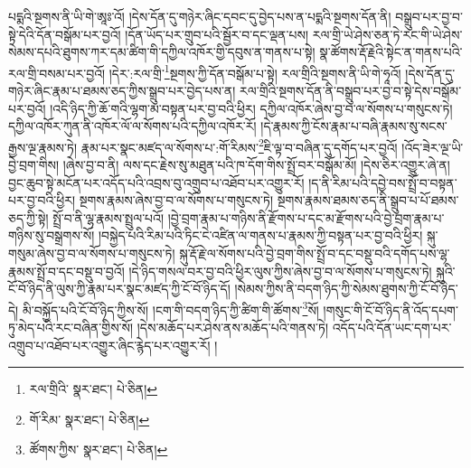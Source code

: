པདྨའི་སྔགས་ནི་ཡི་གེ་ཨཱཿ་འོ། །དེས་དོན་དུ་གཉེར་ཞིང་དབང་དུ་བྱེད་པས་ན་པདྨའི་སྔགས་དོན་ནི། བསྒྲུབ་པར་བྱ་བ་སྟེ་དེའི་དོན་བསྒོམ་པར་བྱའོ། །དོན་ཡོད་པར་གྲུབ་པའི་སྦྱོར་བ་དང་ལྡན་པས། རལ་གྲི་ཡེ་ཤེས་ཅན་ཏེ་རང་གི་ཡེ་ཤེས་སེམས་དཔའི་ཐུགས་ཀར་དམ་ཚིག་གི་དཀྱིལ་འཁོར་གྱི་དབུས་ན་གནས་པ་སྟེ། སྣ་ཚོགས་རྡོ་རྗེའི་སྟེང་ན་གནས་པའི་རལ་གྲི་བསམ་པར་བྱའོ། །དེར་:རལ་གྲི་\footnote{རལ་གྲིའི་  སྣར་ཐང་།  པེ་ཅིན། }སྔགས་ཀྱི་དོན་བསྒོམ་པ་སྟེ། རལ་གྲིའི་སྔགས་ནི་ཡི་གེ་ཧཱའོ། །དེས་དོན་དུ་གཉེར་ཞིང་རྣམ་པ་ཐམས་ཅད་ཀྱིས་སྒྲུབ་པར་བྱེད་པས་ན། རལ་གྲིའི་སྔགས་དོན་ནི་བསྒྲུབ་པར་བྱ་བ་སྟེ་དེས་བསྒོམ་པར་བྱའོ། །འདི་ཉིད་ཀྱི་ཆོ་གའི་ལྷག་མ་བསྟན་པར་བྱ་བའི་ཕྱིར། དཀྱིལ་འཁོར་ཞེས་བྱ་བ་ལ་སོགས་པ་གསུངས་ཏེ། དཀྱིལ་འཁོར་ཀུན་ནི་འཁོར་ལོ་ལ་སོགས་པའི་དཀྱིལ་འཁོར་རོ། །དེ་རྣམས་ཀྱི་ངོས་རྣམ་པ་བཞི་རྣམས་སུ་སངས་རྒྱས་ལྔ་རྣམས་ཏེ། རྣམ་པར་སྣང་མཛད་ལ་སོགས་པ་:གོ་རིམས་\footnote{གོ་རིམ་  སྣར་ཐང་།  པེ་ཅིན། }ཇི་ལྟ་བ་བཞིན་དུ་དགོད་པར་བྱའོ། །འོད་ཟེར་ལྔ་ཡི་བྱེ་བྲག་གིས། །ཞེས་བྱ་བ་ནི། ལས་དང་རྗེས་སུ་མཐུན་པའི་ཁ་དོག་གིས་སྤྲོ་བར་བསྒོམ་མོ། །དེས་ཅིར་འགྱུར་ཞེ་ན། བྱང་ཆུབ་སྟེ་མངོན་པར་འདོད་པའི་འབྲས་བུ་འགྲུབ་པ་འཐོབ་པར་འགྱུར་རོ། །ད་ནི་རིམ་པའི་དབྱེ་བས་སྤྲོ་བ་བསྟན་པར་བྱ་བའི་ཕྱིར། སྔགས་རྣམས་ཞེས་བྱ་བ་ལ་སོགས་པ་གསུངས་ཏེ། སྔགས་རྣམས་ཐམས་ཅད་ནི་སྒྲུབ་པ་པོ་ཐམས་ཅད་ཀྱི་སྟེ། སྤྲོ་བ་ནི་ལྷ་རྣམས་སྤྲུལ་པའོ། །བྱེ་བྲག་རྣམ་པ་གཉིས་ནི་རྫོགས་པ་དང་མ་རྫོགས་པའི་བྱེ་བྲག་རྣམ་པ་གཉིས་སུ་བསྒྲགས་སོ། །བསྐྱེད་པའི་རིམ་པའི་ཏིང་ངེ་འཛིན་ལ་གནས་པ་རྣམས་ཀྱི་བསྟན་པར་བྱ་བའི་ཕྱིར། སྐུ་གསུམ་ཞེས་བྱ་བ་ལ་སོགས་པ་གསུངས་ཏེ། སྐུ་རྡོ་རྗེ་ལ་སོགས་པའི་བྱེ་བྲག་གིས་སྤྲོ་བ་དང་བསྡུ་བའི་དགོད་པས་ལྷ་རྣམས་སྤྲོ་བ་དང་བསྡུ་བ་བྱའོ། །དེ་ཉིད་གསལ་བར་བྱ་བའི་ཕྱིར་ལུས་ཀྱིས་ཞེས་བྱ་བ་ལ་སོགས་པ་གསུངས་ཏེ། སྐུའི་ངོ་བོ་ཉིད་ནི་ལུས་ཀྱི་རྣམ་པར་སྣང་མཛད་ཀྱི་ངོ་བོ་ཉིད་དོ། །སེམས་ཀྱིས་ནི་བདག་ཉིད་ཀྱི་སེམས་ཐུགས་ཀྱི་ངོ་བོ་ཉིད་དེ། མི་བསྐྱོད་པའི་ངོ་བོ་ཉིད་ཀྱིས་སོ། །ངག་གི་བདག་ཉིད་ཀྱི་ཚིག་གི་ཚོགས་\footnote{ཚོགས་ཀྱིས་  སྣར་ཐང་།  པེ་ཅིན། }སོ། །གསུང་གི་ངོ་བོ་ཉིད་ནི་འོད་དཔག་ཏུ་མེད་པའི་རང་བཞིན་གྱིས་སོ། །དེས་མཆོད་པར་ཤེས་ནས་མཆོད་པའི་གནས་ཏེ། འདོད་པའི་དོན་ཡང་དག་པར་འགྲུབ་པ་འཐོབ་པར་འགྱུར་ཞིང་རྙེད་པར་འགྱུར་རོ། །
